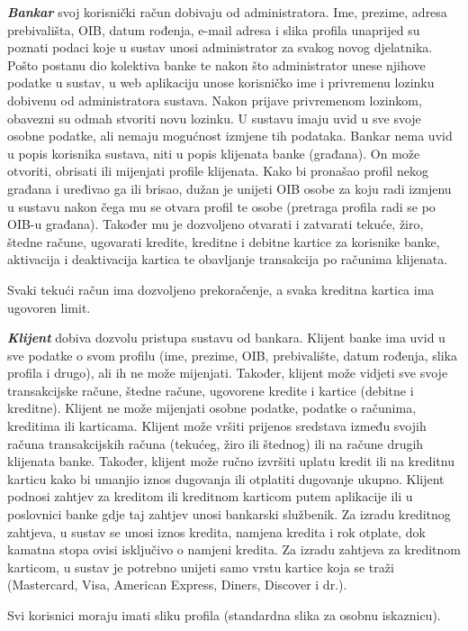 		\textit{\textbf{Bankar}} svoj korisnički račun dobivaju od administratora. Ime, prezime, adresa prebivališta, OIB, datum rođenja, e-mail adresa i slika profila unaprijed su poznati podaci koje u sustav unosi administrator za svakog novog djelatnika. Pošto postanu dio kolektiva banke te nakon što administrator unese njihove podatke u sustav, u web aplikaciju unose korisničko ime i privremenu lozinku dobivenu od administratora sustava. Nakon prijave privremenom lozinkom, obavezni su odmah stvoriti novu lozinku. U sustavu imaju uvid u sve svoje osobne podatke, ali nemaju mogućnost izmjene tih podataka.
		Bankar nema uvid u popis korisnika sustava, niti u popis klijenata banke (građana). On može otvoriti, obrisati ili mijenjati profile klijenata. Kako bi pronašao profil nekog građana i uređivao ga ili brisao, dužan je unijeti OIB osobe za koju radi izmjenu u sustavu nakon čega mu se otvara profil te osobe (pretraga profila radi se po OIB-u građana). Također mu je dozvoljeno otvarati i zatvarati tekuće, žiro, štedne račune, ugovarati kredite, kreditne i debitne kartice za korisnike banke, aktivacija i deaktivacija kartica te obavljanje transakcija po računima klijenata.
		
		Svaki tekući račun ima dozvoljeno prekoračenje, a svaka kreditna kartica ima ugovoren limit.
		
		\textit{\textbf{Klijent}} dobiva dozvolu pristupa sustavu od bankara. Klijent banke ima uvid u sve podatke o svom profilu (ime, prezime, OIB, prebivalište, datum rođenja, slika profila i drugo), ali ih ne može mijenjati. Također, klijent može vidjeti sve svoje transakcijske račune, štedne račune, ugovorene kredite i kartice (debitne i kreditne). Klijent ne može mijenjati osobne podatke, podatke o računima, kreditima ili karticama. Klijent može vršiti prijenos sredstava između svojih računa transakcijskih računa (tekućeg, žiro ili štednog) ili na račune drugih klijenata banke. Također, klijent može ručno izvršiti uplatu kredit ili na kreditnu karticu kako bi umanjio iznos dugovanja ili otplatiti dugovanje ukupno.
		Klijent podnosi zahtjev za kreditom ili kreditnom karticom putem aplikacije ili u poslovnici banke gdje taj zahtjev unosi bankarski službenik. Za izradu kreditnog zahtjeva, u sustav se unosi iznos kredita, namjena kredita i rok otplate, dok kamatna stopa ovisi isključivo o namjeni kredita. Za izradu zahtjeva za kreditnom karticom, u sustav je potrebno unijeti samo vrstu kartice koja se traži (Mastercard, Visa, American Express, Diners, Discover i dr.).
		
		Svi korisnici moraju imati sliku profila (standardna slika za osobnu iskaznicu).
		
